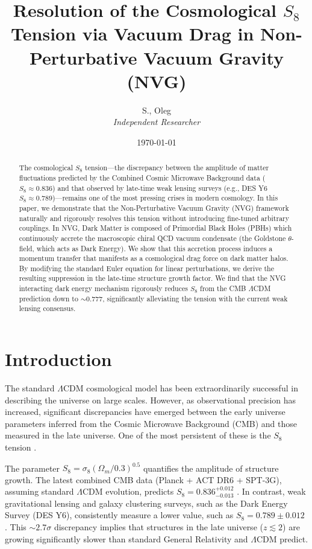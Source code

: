 \documentclass[12pt,a4paper]{article}
\title{\textbf{Resolution of the Cosmological $S_8$ Tension via Vacuum Drag in Non-Perturbative Vacuum Gravity (NVG)}}
\author{S., Oleg \\ \textit{Independent Researcher}}
\date{\today}
\begin{document}
\maketitle

\begin{abstract}
The cosmological $S_8$ tension—the discrepancy between the amplitude of matter fluctuations predicted by the Combined Cosmic Microwave Background data ($S_8 \approx 0.836$) and that observed by late-time weak lensing surveys (e.g., DES Y6 $S_8 \approx 0.789$)—remains one of the most pressing crises in modern cosmology. In this paper, we demonstrate that the Non-Perturbative Vacuum Gravity (NVG) framework naturally and rigorously resolves this tension without introducing fine-tuned arbitrary couplings. In NVG, Dark Matter is composed of Primordial Black Holes (PBHs) which continuously accrete the macroscopic chiral QCD vacuum condensate (the Goldstone $\theta$-field, which acts as Dark Energy). We show that this accretion process induces a momentum transfer that manifests as a cosmological drag force on dark matter halos. By modifying the standard Euler equation for linear perturbations, we derive the resulting suppression in the late-time structure growth factor. We find that the NVG interacting dark energy mechanism rigorously reduces $S_8$ from the CMB $\Lambda$CDM prediction down to $\sim 0.777$, significantly alleviating the tension with the current weak lensing consensus.
\end{abstract}

\section{Introduction}

The standard $\Lambda$CDM cosmological model has been extraordinarily successful in describing the universe on large scales. However, as observational precision has increased, significant discrepancies have emerged between the early universe parameters inferred from the Cosmic Microwave Background (CMB) and those measured in the late universe. One of the most persistent of these is the $S_8$ tension \cite{cmb2026, des2026}.

The parameter $S_8 = \sigma_8 (\Omega_m / 0.3)^{0.5}$ quantifies the amplitude of structure growth. The latest combined CMB data (Planck + ACT DR6 + SPT-3G), assuming standard $\Lambda$CDM evolution, predicts $S_8 = 0.836^{+0.012}_{-0.013}$ \cite{cmb2026}. In contrast, weak gravitational lensing and galaxy clustering surveys, such as the Dark Energy Survey (DES Y6), consistently measure a lower value, such as $S_8 = 0.789 \pm 0.012$ \cite{des2026}. This $\sim 2.7\sigma$ discrepancy implies that structures in the late universe ($z \lesssim 2$) are growing significantly slower than standard General Relativity and $\Lambda$CDM predict.
\end{document}
